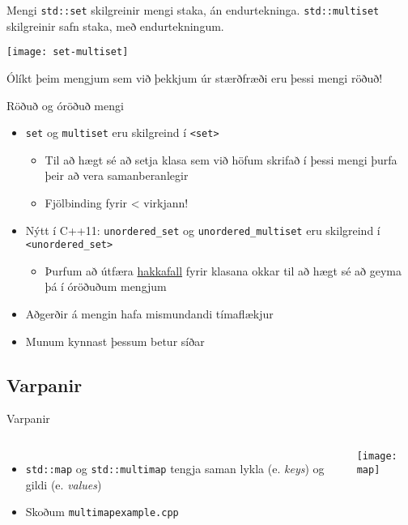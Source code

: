 \begin{frame}{Mengi}
\texttt{std::set} skilgreinir mengi staka, án endurtekninga. \texttt{std::multiset} skilgreinir safn staka, með endurtekningum.

\begin{center}
\texttt{[image: set-multiset]}
\end{center}


Ólíkt þeim mengjum sem við þekkjum úr stærðfræði eru þessi mengi röðuð!
\end{frame}

\begin{frame}{Röðuð og óröðuð mengi}
\begin{itemize}
\item \texttt{set} og \texttt{multiset} eru skilgreind í \texttt{<set>}
\begin{itemize}
\item Til að hægt sé að setja klasa sem við höfum skrifað í þessi mengi þurfa þeir að vera samanberanlegir
\item Fjölbinding fyrir < virkjann!
\end{itemize}
\item Nýtt í C++11: \texttt{unordered\_set} og \texttt{unordered\_multiset} eru skilgreind í \texttt{<unordered\_set>}
\begin{itemize}
\item Þurfum að útfæra \href{http://en.cppreference.com/w/cpp/utility/hash}{hakkafall} fyrir klasana okkar til að hægt sé að geyma þá í óröðuðum mengjum
\end{itemize}
\item Aðgerðir á mengin hafa mismundandi tímaflækjur
\item Munum kynnast þessum betur síðar
\end{itemize}
\end{frame}

\subsection{Varpanir}

\begin{frame}{Varpanir}
\begin{columns}
\begin{itemize}
\item \texttt{std::map} og \texttt{std::multimap} tengja saman lykla (e. \emph{keys}) og gildi (e. \emph{values})
\item Skoðum \texttt{multimapexample.cpp}
\end{itemize}
\begin{center}
\texttt{[image: map]}
\end{center}
\end{columns}
\end{frame}